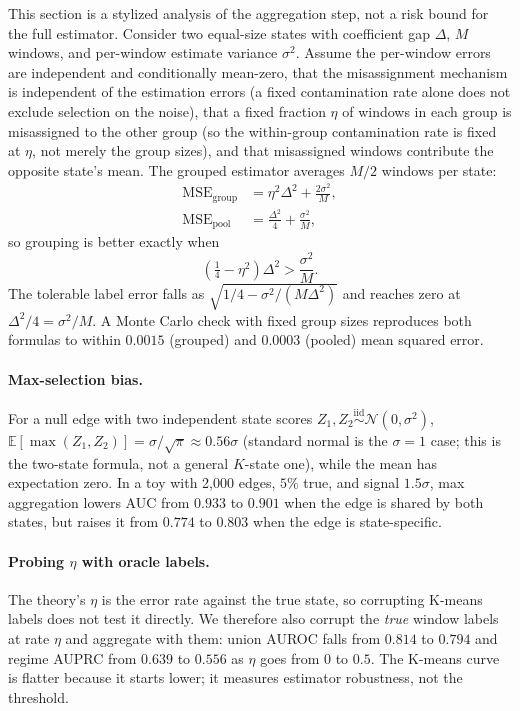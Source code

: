 \documentclass[11pt]{article}
\begin{document}
This section is a stylized analysis of the aggregation step, not a risk bound
for the full estimator. Consider two equal-size states with coefficient gap
$\Delta$, $M$ windows, and per-window estimate variance $\sigma^2$. Assume the
per-window errors are independent and conditionally mean-zero, that the
misassignment mechanism is independent of the estimation errors (a fixed
contamination rate alone does not exclude selection on the noise), that a fixed
fraction $\eta$ of windows in each group is misassigned to the other group (so
the within-group contamination rate is fixed at $\eta$, not merely the group
sizes), and that misassigned windows contribute the opposite state's mean. The
grouped estimator averages $M/2$ windows per state:
\begin{align}
\mathrm{MSE}_{\mathrm{group}} &= \eta^2\Delta^2 + \frac{2\sigma^2}{M},\\
\mathrm{MSE}_{\mathrm{pool}} &= \frac{\Delta^2}{4} + \frac{\sigma^2}{M},
\end{align}
so grouping is better exactly when
\begin{equation}
\left(\tfrac14-\eta^2\right)\Delta^2 > \frac{\sigma^2}{M}.
\label{eq:threshold}
\end{equation}
The tolerable label error falls as
$\sqrt{1/4-\sigma^2/(M\Delta^2)}$ and reaches zero at
$\Delta^2/4=\sigma^2/M$. A Monte Carlo check with fixed group sizes reproduces
both formulas to within $0.0015$ (grouped) and $0.0003$ (pooled) mean squared
error.

\paragraph{Max-selection bias.}
For a null edge with two independent state scores
$Z_1,Z_2\overset{\mathrm{iid}}{\sim}\mathcal N(0,\sigma^2)$,
$\mathbb{E}[\max(Z_1,Z_2)]=\sigma/\sqrt{\pi}\approx0.56\sigma$ (standard normal
is the $\sigma{=}1$ case; this is the two-state formula, not a general $K$-state
one), while the mean has expectation zero. In a toy with 2{,}000 edges, $5\%$
true, and signal $1.5\sigma$, max aggregation lowers AUC from $0.933$ to $0.901$
when the edge is shared by both states, but raises it from $0.774$ to $0.803$
when the edge is state-specific.

\paragraph{Probing $\eta$ with oracle labels.}
The theory's $\eta$ is the error rate against the true state, so corrupting
K-means labels does not test it directly. We therefore also corrupt the
\emph{true} window labels at rate $\eta$ and aggregate with them: union AUROC
falls from $0.814$ to $0.794$ and regime AUPRC from $0.639$ to $0.556$ as $\eta$
goes from $0$ to $0.5$. The K-means curve is flatter because it starts lower; it
measures estimator robustness, not the threshold.
\end{document}
